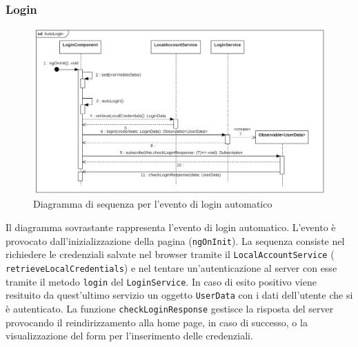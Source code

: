 \subsubsection{Login}
\begin{figure}[H]
	\centering
	\includegraphics[width=18cm]{res/images/webapp-autologin-diagrammaSequenza.png}
	\caption{Diagramma di sequenza per l'evento di login automatico}
	\label{fig:DiagrammaSequenzaAutoLogin}
\end{figure}
Il diagramma sovrastante rappresenta l'evento di login automatico. L'evento è provocato dall'inizializzazione della pagina (\texttt{ngOnInit}). La sequenza consiste nel richiedere le credenziali salvate nel browser tramite il \texttt{LocalAccountService} ( \texttt{retrieveLocalCredentials}) e nel tentare un'autenticazione al server con esse tramite il metodo \texttt{login} del \texttt{LoginService}. In caso di esito positivo viene resituito da quest'ultimo servizio un oggetto \texttt{UserData} con i dati dell'utente che si è autenticato. La funzione \texttt{checkLoginResponse} gestisce la risposta del server provocando il reindirizzamento alla home page, in caso di successo, o la visualizzazione del form per l'inserimento delle credenziali.


